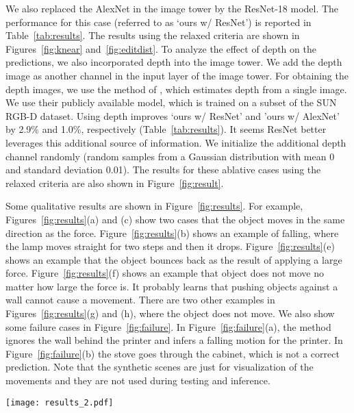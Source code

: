 \documentclass[runningheads]{llncs}
\begin{document}
We also replaced the AlexNet in the image tower by the ResNet-18 \cite{he16} model. The performance for this case (referred to as `ours w/ ResNet') is reported in Table~\ref{tab:results}. The results using the relaxed criteria are shown in Figures~\ref{fig:knear} and~\ref{fig:editdist}. To analyze the effect of depth on the predictions, we also incorporated depth into the image tower. We add the depth image as another channel in the input layer of the image tower. For obtaining the depth images, we use the method of \cite{eigen14}, which estimates depth from a single image. We use their publicly available model, which is trained on a subset of the SUN RGB-D dataset. Using depth improves `ours w/ ResNet' and 'ours w/ AlexNet' by 2.9\% and 1.0\%, respectively (Table~\ref{tab:results}). It seems ResNet better leverages this additional source of information. We initialize the additional depth channel randomly (random samples from a Gaussian distribution with mean 0 and standard deviation 0.01). The results for these ablative cases using the relaxed criteria are also shown in Figure~\ref{fig:result}. 


Some qualitative results are shown in Figure~\ref{fig:results}. For example, Figures~\ref{fig:results}(a) and (c) show two cases that the object moves in the same direction as the force. Figure~\ref{fig:results}(b) shows an example of falling, where the lamp moves straight for two steps and then it drops. Figure~\ref{fig:results}(e) shows an example that the object bounces back as the result of applying a large force. Figure~\ref{fig:results}(f) shows an example that object does not move no matter how large the force is. It probably learns that pushing objects against a wall cannot cause a movement. There are two other examples in Figures~\ref{fig:results}(g) and (h), where the object does not move. We also show some failure cases in Figure~\ref{fig:failure}. In Figure~\ref{fig:failure}(a), the method ignores the wall behind the printer and infers a falling motion for the printer. In Figure~\ref{fig:failure}(b) the stove goes through the cabinet, which is not a correct prediction. Note that the synthetic scenes are just for visualization of the movements and they are not used during testing and inference. 

\begin{figure*}[t!]
\centering
  \texttt{[image: results\_2.pdf]}
\caption{\textbf{Qualitative results.} The left figure shows the force (color arrow) applied to the image. Different force magnitudes are shown with different colors, where blue, yellow, and red represent small, medium and large forces, respectively. The second image from the left shows the output of our method, which is a sequence of velocity vectors in 3D. The red point is the step that the velocity becomes zero. The resulted motion is visualized in the synthetic scenes. The object that moves is shown in yellow. Note that these synthetic scenes are for visualization purposes and they are not used during test. For clarity, we do not show walls.}
\label{fig:results}
\end{figure*} 
\end{document}
